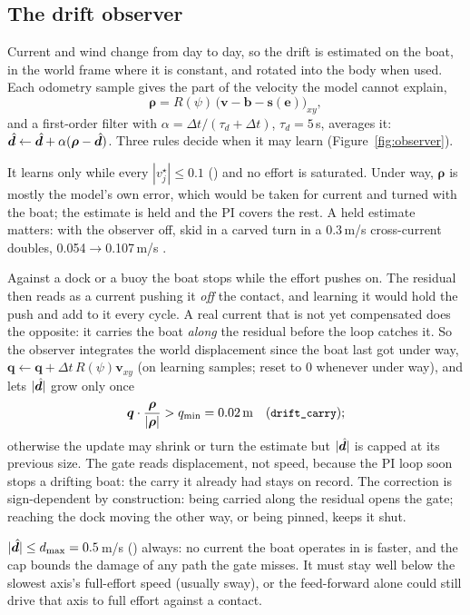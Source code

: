 \subsection{The drift observer}
\label{sec:observer}
Current and wind change from day to day, so the drift is estimated on the boat, in the world
frame where it is constant, and rotated into the body when used. Each odometry sample gives
the part of the velocity the model cannot explain,
\[
  \bm\rho = R(\psi)\,\big(\bm v - \bm b - \bm s(\bm e)\big)_{xy},
\]
and a first-order filter with $\alpha = \Delta t/(\tau_d + \Delta t)$, $\tau_d = 5$\,s, averages it:
$\hat{\bm d} \leftarrow \hat{\bm d} + \alpha(\bm\rho - \hat{\bm d})$. Three rules decide when it may learn
(Figure~\ref{fig:observer}).

\begin{description}[leftmargin=1em, itemsep=2pt]
\item[Only at rest.] It learns only while every $|v^\star_j| \le 0.1$ ()
  and no effort is saturated. Under way, $\bm\rho$ is mostly the model's own error, which would
  be taken for current and turned with the boat; the estimate is held and the PI covers the
  rest. A held estimate matters: with the observer off, skid in a carved turn in a 0.3\,m/s
  cross-current doubles, 0.054$\to$0.107\,m/s .
\item[The sign gate.] Against a dock or a buoy the boat stops while the effort pushes on. The
  residual then reads as a current pushing it \emph{off} the contact, and learning it would
  hold the push and add to it every cycle. A real current that is not yet compensated does the
  opposite: it carries the boat \emph{along} the residual before the loop catches it. So the
  observer integrates the world displacement since the boat last got under way,
  $\bm q \leftarrow \bm q + \Delta t\,R(\psi)\bm v_{xy}$ (on learning samples; reset to 0 whenever
  under way), and lets $|\hat{\bm d}|$ grow only once
  \[
    \bm q\cdot\frac{\bm\rho}{|\bm\rho|} > q_\text{min} = 0.02\text{\,m}\quad(\texttt{\small drift\_carry});
  \]
  otherwise the update may shrink or turn the estimate but $|\hat{\bm d}|$ is capped at its previous
  size. The gate reads displacement, not speed, because the PI loop soon stops a drifting boat:
  the carry it already had stays on record. The correction is sign-dependent by construction:
  being carried along the residual opens the gate; reaching the dock moving the other way, or
  being pinned, keeps it shut.
\item[The cap.] $|\hat{\bm d}| \le d_\text{max} = 0.5$\,m/s () always: no current
  the boat operates in is faster, and the cap bounds the damage of any path the gate misses. It
  must stay well below the slowest axis's full-effort speed (usually sway), or the feed-forward
  alone could still drive that axis to full effort against a contact.
\end{description}

